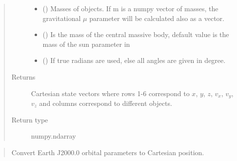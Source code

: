 \documentclass[letterpaper,10pt,english]{sphinxmanual}
\begin{document}
\begin{fulllineitems}
\begin{quote}
\begin{description}
\begin{itemize}
\item {} 
 () \textendash{} Masses of objects. If m is a numpy vector of masses, the gravitational \(\mu\) parameter will be calculated also as a vector.

\item {} 
 () \textendash{} Is the mass of the central massive body, default value is the mass of the sun parameter in {\hyperref[\detokenize{modules/dpt_tools:dpt_tools.M_sol}]{}}

\item {} 
 () \textendash{} If true radians are used, else all angles are given in degree.

\end{itemize}

\item[{Returns}] \leavevmode
Cartesian state vectors where rows 1-6 correspond to \(x\), \(y\), \(z\), \(v_x\), \(v_y\), \(v_z\) and columns correspond to different objects.

\item[{Return type}] \leavevmode
numpy.ndarray

\end{description}\end{quote}

\begin{quote}

Convert Earth J2000.0 orbital parameters to Cartesian position.

%
\begin{sphinxVerbatim}[commandchars=\\\{\}]
   
   
   

  \PYG{p}{[}
   
   
   
   
   
   
\PYG{p}{]} 


\end{sphinxVerbatim}
\end{quote}
\end{fulllineitems}
\end{document}
